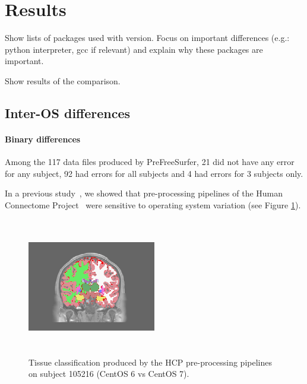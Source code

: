 \documentclass{article}
\begin{document}
\section{Results}

Show lists of packages used with version. Focus on important
differences (e.g.: python interpreter, gcc if relevant) and explain
why these packages are important.

Show results of the comparison.

\subsection{Inter-OS differences}


\paragraph{Binary differences}


Among the 117 data files produced by PreFreeSurfer, 21 did not have any error for any subject, 92 had errors 
for all subjects and 4 had errors for 3 subjects only. 

In a previous study~\cite{Scaria2017}, we showed that
pre-processing pipelines of the Human Connectome
Project~\cite{Glasser2013} were sensitive to operating system
variation (see Figure \ref{fig:1}).
\begin{figure}
  \includegraphics[width=0.5\textwidth, height=6cm]{images/brain_classification.png}
  \caption{Tissue classification produced by the HCP pre-processing
    pipelines on subject 105216 (CentOS 6 vs CentOS 7).}
  \label{fig:1}
\end{figure}
\end{document}
